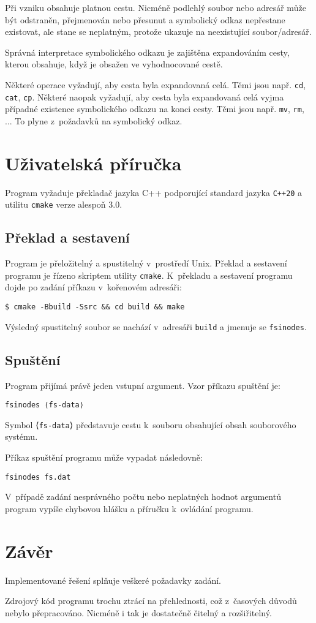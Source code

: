 \documentclass[a4paper, 12pt]{report}
\begin{document}
Při vzniku obsahuje platnou cestu. Nicméně podlehlý soubor nebo adresář může být odstraněn, přejmenován nebo přesunut a symbolický odkaz nepřestane existovat, ale stane se neplatným, protože ukazuje na neexistující soubor/adresář.

Správná interpretace symbolického odkazu je zajištěna expandováním cesty, kterou obsahuje, když je obsažen ve vyhodnocované cestě.

Některé operace vyžadují, aby cesta byla expandovaná celá. Těmi jsou např. \texttt{cd}, \texttt{cat}, \texttt{cp}. Některé naopak vyžadují, aby cesta byla expandovaná celá vyjma případné existence symbolického odkazu na konci cesty. Těmi jsou např. \texttt{mv}, \texttt{rm}, ... To plyne z~požadavků na symbolický odkaz.

\chapter{Uživatelská příručka}

Program vyžaduje překladač jazyka C++ podporující standard jazyka \texttt{C++20} a utilitu \texttt{cmake} verze alespoň 3.0.

\section{Překlad a sestavení}

Program je přeložitelný a spustitelný v~prostředí Unix. Překlad a sestavení programu je řízeno skriptem utility \texttt{cmake}. K~překladu a sestavení programu dojde po zadání příkazu v~kořenovém adresáři:

\texttt{\$ cmake -Bbuild -Ssrc \&\& cd build \&\& make}

Výsledný spustitelný soubor se nachází v~adresáři \texttt{build} a jmenuje se \texttt{fsinodes}.

\section{Spuštění}

Program přijímá právě jeden vstupní argument. Vzor příkazu spuštění je:

\texttt{fsinodes ⟨fs-data⟩}

Symbol ⟨\texttt{fs-data}⟩ představuje cestu k~souboru obsahující obsah souborového systému.

Příkaz spuštění programu může vypadat následovně:

\texttt{fsinodes fs.dat}

V~případě zadání nesprávného počtu nebo neplatných hodnot argumentů program vypíše chybovou hlášku a příručku k~ovládání programu.

\chapter{Závěr}

Implementované řešení splňuje veškeré požadavky zadání.

Zdrojový kód programu trochu ztrácí na přehlednosti, což z~časových důvodů nebylo přepracováno. Nicméně i tak je dostatečně čitelný a rozšiřitelný.

\printbibliography
\end{document}
